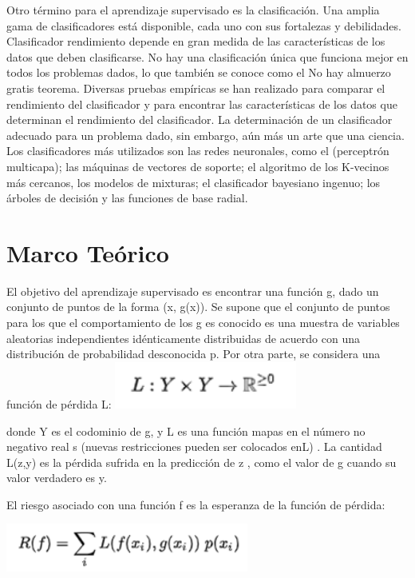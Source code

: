 \documentclass[12pt,a4paper]{report}
\begin{document}
Otro término para el aprendizaje supervisado es la clasificación. Una amplia gama de clasificadores está disponible, cada uno con sus fortalezas y debilidades. Clasificador rendimiento depende en gran medida de las características de los datos que deben clasificarse. No hay una clasificación única que funciona mejor en todos los problemas dados, lo que también se conoce como el No hay almuerzo gratis teorema. Diversas pruebas empíricas se han realizado para comparar el rendimiento del clasificador y para encontrar las características de los datos que determinan el rendimiento del clasificador. La determinación de un clasificador adecuado para un problema dado, sin embargo, aún más un arte que una ciencia.
Los clasificadores más utilizados son las redes neuronales, como el (perceptrón multicapa); las máquinas de vectores de soporte; el algoritmo de los K-vecinos más cercanos, los modelos de mixturas; el clasificador bayesiano ingenuo; los árboles de decisión y las funciones de base radial.

\section{Marco Teórico}
El objetivo del aprendizaje supervisado es encontrar una función g, dado un conjunto de puntos de la forma (x, g(x)).
Se supone que el conjunto de puntos para los que el comportamiento de los g es conocido es una muestra de variables aleatorias independientes idénticamente distribuidas de acuerdo con una distribución de probabilidad desconocida p. Por otra parte, se considera una función de pérdida L:
\includegraphics[width=6cm]{./images/1}\par\vspace{1cm}

donde Y es el codominio de g, y L es una función mapas en el número no negativo real s (nuevas restricciones pueden ser colocados enL) . La cantidad L(z,y) es la pérdida sufrida en la predicción de z , como el valor de g cuando su valor verdadero es y.

El riesgo asociado con una función f es la esperanza de la función de pérdida:

\includegraphics[width=8cm]{./images/2}\par\vspace{1cm}
\end{document}

